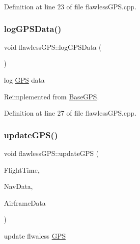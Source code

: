 Definition at line 23 of file flawless\+G\+P\+S.\+cpp.

\mbox{\label{classflawless_g_p_s_a764a28d4434bd497b3701dbff915291f}} 
\subsubsection{\texorpdfstring{log\+G\+P\+S\+Data()}{logGPSData()}}
{\footnotesize\ttfamily void flawless\+G\+P\+S\+::log\+G\+P\+S\+Data (\begin{DoxyParamCaption}{ }\end{DoxyParamCaption})\hspace{0.3cm}{\ttfamily [virtual]}}



log \hyperlink{class_g_p_s}{G\+PS} data 



Reimplemented from \hyperlink{class_base_g_p_s_ad62094ad9ac6e9813cd65e63aeb7df13}{Base\+G\+PS}.



Definition at line 27 of file flawless\+G\+P\+S.\+cpp.

\mbox{\label{classflawless_g_p_s_aa93a0161307e087120572c717dd42a70}} 
\subsubsection{\texorpdfstring{update\+G\+P\+S()}{updateGPS()}}
{\footnotesize\ttfamily void flawless\+G\+P\+S\+::update\+G\+PS (\begin{DoxyParamCaption}\item[{\hyperlink{group___tools_ga3f1431cb9f76da10f59246d1d743dc2c}{Float64}}]{Flight\+Time,  }\item[{Navigation\+Struct \&}]{Nav\+Data,  }\item[{Airframe\+Struct \&}]{Airframe\+Data }\end{DoxyParamCaption})\hspace{0.3cm}{\ttfamily [virtual]}}



update flwaless \hyperlink{class_g_p_s}{G\+PS} 


